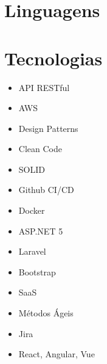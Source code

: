 \documentclass[a4paper]{curriculo}
\begin{document}
\begin{minipage}[t]{0.45\textwidth}
    \vspace{-\baselineskip}
	\section{Linguagens}
	\vspace{-1.2em}
	\begin{barchart}{3}
	\end{barchart}
\end{minipage}
\hfill %
\begin{minipage}[t]{0.55\textwidth}
    \vspace{-\baselineskip}
	\section{Tecnologias}
		\begin{minipage}[t]{0.45\textwidth}
			\begin{itemize}[itemsep=0.01em,topsep=0pt,leftmargin=*]
				\item API RESTful
				\item AWS
				\item Design Patterns
				\item Clean Code
				\item SOLID
				\item Github CI/CD
				\item Docker
			\end{itemize}
		\end{minipage}
		\begin{minipage}[t]{0.45\textwidth}
			\begin{itemize}[itemsep=0.01em,topsep=0pt,leftmargin=*]
				\item ASP.NET 5
				\item Laravel
				\item Bootstrap
				\item SaaS
				\item Métodos Ágeis
				\item Jira
				\item React, Angular, Vue
			\end{itemize}
	\end{minipage}
\end{minipage}

\end{document}
